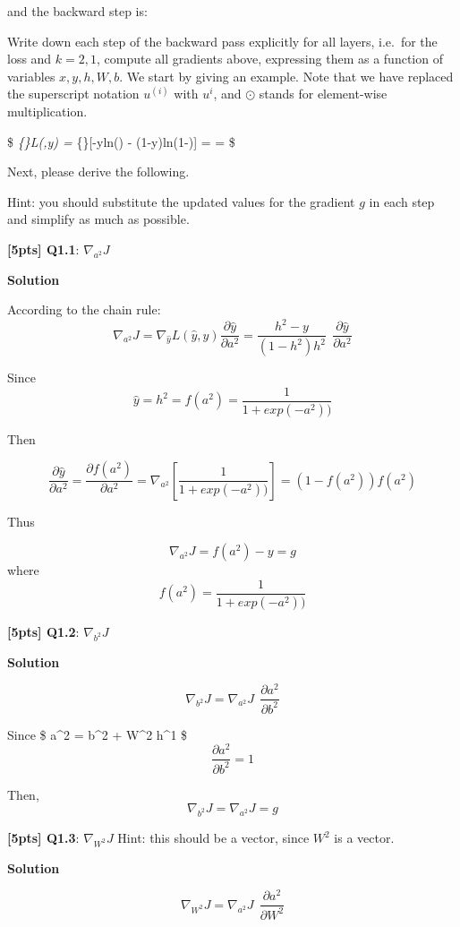 \documentclass[11pt]{article}
\begin{document}
and the backward step is:

    Write down each step of the backward pass explicitly for all layers,
i.e.~for the loss and \(k=2,1\), compute all gradients above, expressing
them as a function of variables \(x, y, h, W, b\). We start by giving an
example. Note that we have replaced the superscript notation \(u^{(i)}\)
with \(u^i\), and \(\odot\) stands for element-wise multiplication.

\$ \nabla\emph{\{\}L(,y) =
\nabla}\{\}{[}-yln() - (1-y)ln(1-){]} =
 = \$

Next, please derive the following.

Hint: you should substitute the updated values for the gradient \(g\) in
each step and simplify as much as possible.

    \textbf{{[}5pts{]} Q1.1}: \(\nabla_{a^2}J\)

    \textbf{Solution}

According to the chain rule:
\[ \nabla_{a^2}J = \nabla_{\hat{y}}L(\hat{y},y) \frac{\partial \hat{y}}{\partial a^2}
    =  \frac{h^2-y}{(1-h^2)h^2} \ \ \frac{\partial \hat{y}}{\partial a^2} \]

Since \[ \hat{y} = h^2 = f(a^2) = \frac{1}{1+exp(-a^2))} \]

Then

\[  \frac{\partial \hat{y}}{\partial a^2} = \frac{\partial f(a^2)}{\partial a^2} 
    = \nabla_{a^2} [\frac{1}{1+exp(-a^2))}] 
      = (1 - f(a^2))f(a^2)  \]

Thus

\[ \nabla_{a^2}J = f(a^2) - y = g\] where
\[ f(a^2) = \frac{1}{1+exp(-a^2))} \]

    \textbf{{[}5pts{]} Q1.2}: \(\nabla_{b^2}J\)

    \textbf{Solution}

\[ \nabla_{b^2}J = \nabla_{a^2}J \ \ \frac{\partial a^2}{\partial b^2} \]

Since \$ a\^{}2 = b\^{}2 + W\^{}2 h\^{}1 \$
\[ \frac{\partial a^2}{\partial b^2} = 1 \]

Then, \[ \nabla_{b^2}J = \nabla_{a^2}J = g  \]

    \textbf{{[}5pts{]} Q1.3}: \(\nabla_{W^2}J\) Hint: this should be a
vector, since \(W^2\) is a vector. 

    \textbf{Solution}

\[ \nabla_{W^2}J = \nabla_{a^2}J \ \ \frac{\partial a^2}{\partial W^2} \]
\end{document}
